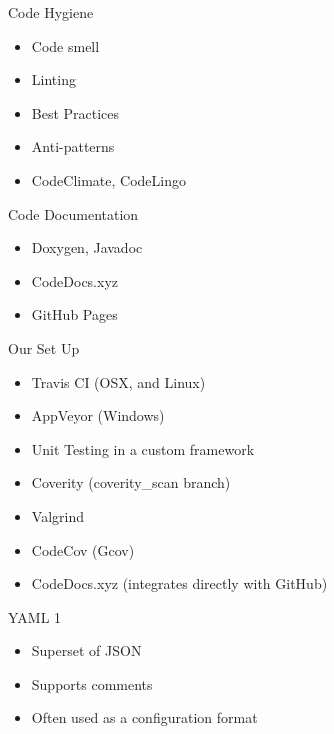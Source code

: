 \documentclass{beamer}
\begin{document}
\begin{frame}{Code Hygiene}
	\begin{itemize}
		\item Code smell
		\item Linting
		\item Best Practices
		\item Anti-patterns
		\item CodeClimate, CodeLingo
	\end{itemize}
\end{frame}

\begin{frame}{Code Documentation}
	\begin{itemize}
		\item Doxygen, Javadoc
		\item CodeDocs.xyz
		\item GitHub Pages
	\end{itemize}
\end{frame}

\begin{frame}{Our Set Up}
	\begin{itemize}
		\item Travis CI (OSX, and Linux)
		\item AppVeyor (Windows)
		\item Unit Testing in a custom framework
		\item Coverity (coverity\_scan branch)
		\item Valgrind
		\item CodeCov (Gcov)
		\item CodeDocs.xyz (integrates directly with GitHub)
	\end{itemize}
\end{frame}

\begin{frame}{YAML 1}
	\begin{itemize}
		\item Superset of JSON
		\item Supports comments
		\item Often used as a configuration format
	\end{itemize}
\end{frame}

\end{document}

